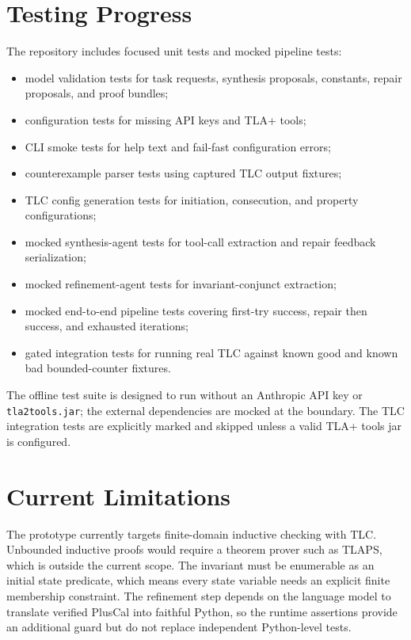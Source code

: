 \documentclass[11pt]{article}
\begin{document}
\section{Testing Progress}

The repository includes focused unit tests and mocked pipeline tests:

\begin{itemize}
  \item model validation tests for task requests, synthesis proposals,
  constants, repair proposals, and proof bundles;
  \item configuration tests for missing API keys and TLA+ tools;
  \item CLI smoke tests for help text and fail-fast configuration errors;
  \item counterexample parser tests using captured TLC output fixtures;
  \item TLC config generation tests for initiation, consecution, and property
  configurations;
  \item mocked synthesis-agent tests for tool-call extraction and repair
  feedback serialization;
  \item mocked refinement-agent tests for invariant-conjunct extraction;
  \item mocked end-to-end pipeline tests covering first-try success, repair
  then success, and exhausted iterations;
  \item gated integration tests for running real TLC against known good and
  known bad bounded-counter fixtures.
\end{itemize}

The offline test suite is designed to run without an Anthropic API key or
\texttt{tla2tools.jar}; the external dependencies are mocked at the boundary.
The TLC integration tests are explicitly marked and skipped unless a valid
TLA+ tools jar is configured.

\section{Current Limitations}

The prototype currently targets finite-domain inductive checking with TLC.
Unbounded inductive proofs would require a theorem prover such as TLAPS, which
is outside the current scope. The invariant must be enumerable as an initial
state predicate, which means every state variable needs an explicit finite
membership constraint. The refinement step depends on the language model to
translate verified PlusCal into faithful Python, so the runtime assertions
provide an additional guard but do not replace independent Python-level tests.
\end{document}
